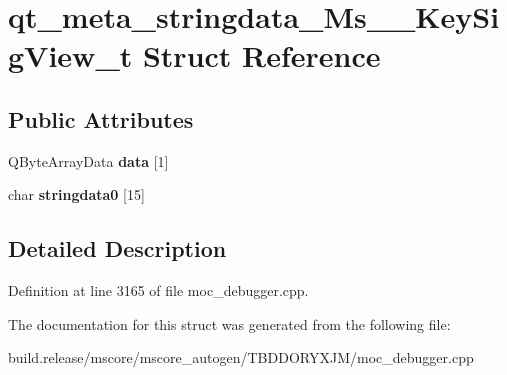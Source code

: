 \hypertarget{structqt__meta__stringdata___ms_____key_sig_view__t}{}\section{qt\+\_\+meta\+\_\+stringdata\+\_\+\+Ms\+\_\+\+\_\+\+Key\+Sig\+View\+\_\+t Struct Reference}
\label{structqt__meta__stringdata___ms_____key_sig_view__t}
\subsection*{Public Attributes}
\begin{DoxyCompactItemize}
\item 
\mbox{\label{structqt__meta__stringdata___ms_____key_sig_view__t_a02e8fa56882266603db95d9cdd6d18f9}} 
Q\+Byte\+Array\+Data {\bfseries data} \mbox{[}1\mbox{]}
\item 
\mbox{\label{structqt__meta__stringdata___ms_____key_sig_view__t_a52a59d48ac4818e850213f0c1e09676c}} 
char {\bfseries stringdata0} \mbox{[}15\mbox{]}
\end{DoxyCompactItemize}


\subsection{Detailed Description}


Definition at line 3165 of file moc\+\_\+debugger.\+cpp.



The documentation for this struct was generated from the following file\+:\begin{DoxyCompactItemize}
\item 
build.\+release/mscore/mscore\+\_\+autogen/\+T\+B\+D\+D\+O\+R\+Y\+X\+J\+M/moc\+\_\+debugger.\+cpp\end{DoxyCompactItemize}
